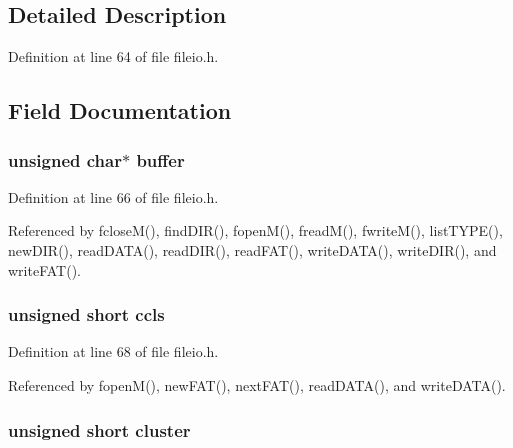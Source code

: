 \subsection{Detailed Description}


Definition at line 64 of file fileio.\-h.



\subsection{Field Documentation}
\hypertarget{struct_m_f_i_l_e_a70e7ad2e1a45c8db5fba9ad4778bd400}{
\subsubsection[{buffer}]{\setlength{\rightskip}{0pt plus 5cm}unsigned char$\ast$ buffer}}\label{struct_m_f_i_l_e_a70e7ad2e1a45c8db5fba9ad4778bd400}


Definition at line 66 of file fileio.\-h.



Referenced by fclose\-M(), find\-D\-I\-R(), fopen\-M(), fread\-M(), fwrite\-M(), list\-T\-Y\-P\-E(), new\-D\-I\-R(), read\-D\-A\-T\-A(), read\-D\-I\-R(), read\-F\-A\-T(), write\-D\-A\-T\-A(), write\-D\-I\-R(), and write\-F\-A\-T().

\hypertarget{struct_m_f_i_l_e_aca8da61849ae0d7b02b5cb16d10f49d9}{
\subsubsection[{ccls}]{\setlength{\rightskip}{0pt plus 5cm}unsigned short ccls}}\label{struct_m_f_i_l_e_aca8da61849ae0d7b02b5cb16d10f49d9}


Definition at line 68 of file fileio.\-h.



Referenced by fopen\-M(), new\-F\-A\-T(), next\-F\-A\-T(), read\-D\-A\-T\-A(), and write\-D\-A\-T\-A().

\hypertarget{struct_m_f_i_l_e_a17846faf54d8f2b8a1dcf87afd2a9775}{
\subsubsection[{cluster}]{\setlength{\rightskip}{0pt plus 5cm}unsigned short cluster}}\label{struct_m_f_i_l_e_a17846faf54d8f2b8a1dcf87afd2a9775}


